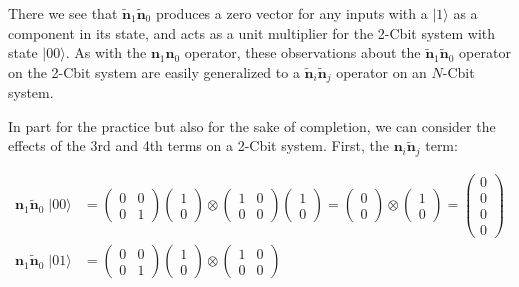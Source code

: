 \documentclass{article}
\begin{document}
There we see that $\bm{\widetilde{n}}_1\bm{\widetilde{n}}_0$ produces a zero vector for any inputs with a $|1\rangle$ as a component in its state, and acts as a unit multiplier for the 2-Cbit system with state $|00\rangle$. As with the $\bm{n}_1\bm{n}_0$ operator, these observations about the $\bm{\widetilde{n}}_1\bm{\widetilde{n}}_0$ operator on the 2-Cbit system are easily generalized to a $\bm{\widetilde{n}}_i\bm{\widetilde{n}}_j$ operator on an $N$-Cbit system.

\vspace{0.125in}

In part for the practice but also for the sake of completion, we can consider the effects of the 3rd and 4th terms on a 2-Cbit system. First, the $\bm{n}_i\bm{\widetilde{n}}_j$ term:

\begin{align*}
\bm{n}_1\bm{\widetilde{n}}_0 \; |00\rangle
  &= \begin{pmatrix}0 & 0\\0 & 1\end{pmatrix}
     \begin{pmatrix}1\\0\end{pmatrix}
     \otimes
     \begin{pmatrix}1 & 0\\0 & 0\end{pmatrix}
     \begin{pmatrix}1\\0\end{pmatrix}
     = \begin{pmatrix}0\\0\end{pmatrix}
     \otimes
     \begin{pmatrix}1\\0\end{pmatrix}
     = \begin{pmatrix}0\\0\\0\\0\end{pmatrix}\\
\bm{n}_1\bm{\widetilde{n}}_0 \; |01\rangle
  &= \begin{pmatrix}0 & 0\\0 & 1\end{pmatrix}
     \begin{pmatrix}1\\0\end{pmatrix}
     \otimes
     \begin{pmatrix}1 & 0\\0 & 0\end{pmatrix}

\end{align*}
\end{document}
